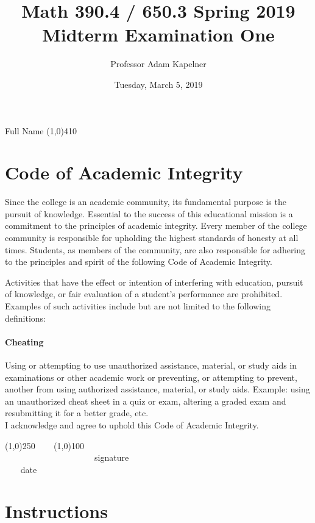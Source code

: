 \documentclass[12pt]{article}
\title{Math 390.4 / 650.3 Spring 2019 \\ Midterm Examination One}
\author{Professor Adam Kapelner}
\date{Tuesday, March 5, 2019}
\begin{document}
\maketitle

\noindent Full Name \line(1,0){410}

\thispagestyle{empty}

\section*{Code of Academic Integrity}

\footnotesize
Since the college is an academic community, its fundamental purpose is the pursuit of knowledge. Essential to the success of this educational mission is a commitment to the principles of academic integrity. Every member of the college community is responsible for upholding the highest standards of honesty at all times. Students, as members of the community, are also responsible for adhering to the principles and spirit of the following Code of Academic Integrity.

Activities that have the effect or intention of interfering with education, pursuit of knowledge, or fair evaluation of a student's performance are prohibited. Examples of such activities include but are not limited to the following definitions:

\paragraph{Cheating} Using or attempting to use unauthorized assistance, material, or study aids in examinations or other academic work or preventing, or attempting to prevent, another from using authorized assistance, material, or study aids. Example: using an unauthorized cheat sheet in a quiz or exam, altering a graded exam and resubmitting it for a better grade, etc.
\\

\noindent I acknowledge and agree to uphold this Code of Academic Integrity. \\

\begin{center}
\line(1,0){250} ~~~ \line(1,0){100}\\
~~~~~~~~~~~~~~~~~~~~~signature~~~~~~~~~~~~~~~~~~~~~~~~~~~~~~~~~~~~~~~~~~~~~ date
\end{center}

\normalsize

\section*{Instructions}
\end{document}

